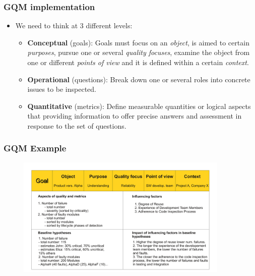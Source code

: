 \documentclass{beamer}
\begin{document}
\begin{frame}
 \frametitle{GQM implementation}
 \begin{itemize}
  \item We need to think at 3 different levels:
   \begin{itemize}
    \item \textbf{Conceptual} (goals): Goals must focus on an \textit{object},
is aimed to certain \textit{purposes}, pursue one or several \textit{quality focuses},
examine the object from one or different \textit{points of view} and it is
defined within a certain \textit{context}.
    \item \textbf{Operational} (questions): Break down one or several roles into
concrete issues to be inspected.
    \item \textbf{Quantitative} (metrics): Define measurable quantities or
logical aspects that providing information to offer precise answers and assessment in
response to the set of questions.
   \end{itemize}

  \end{itemize}


\end{frame}

\begin{frame}
 \frametitle{GQM Example}
  \begin{center}
  \begin{figure}
    \includegraphics[height=5.75cm]{figs/gqm-example.pdf}
  \end{figure}
  \end{center}
\end{frame}

\end{document}
